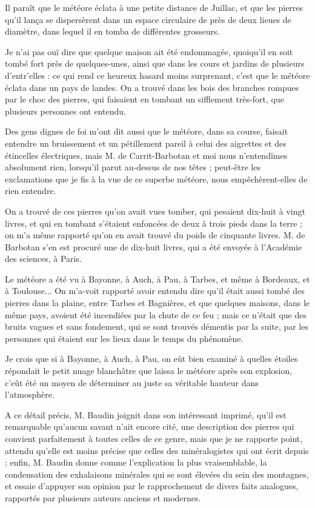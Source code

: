 \documentclass[a4paper, 12pt, oneside, french]{article}
\begin{document}
\og Il paraît que le météore éclata à une petite distance de Juillac, et que les pierres qu'il lança se dispersèrent dans un espace circulaire de près de deux lieues de diamètre, dans lequel il en tomba de différentes grosseurs. \fg

\og Je n'ai pas ouï dire que quelque maison ait été endommagée, quoiqu'il en soit tombé fort près de quelques-unes, ainsi que dans les cours et jardins de plusieurs d'entr'elles : ce qui rend ce heureux hasard moins surprenant, c'est que le météore éclata dans un pays de landes. On a trouvé dans les bois des branches rompues par le choc des pierres, qui faisaient en tombant un sifflement très-fort, que plusieurs personnes ont entendu. \fg

\og Des gens dignes de foi m'ont dit aussi que le météore, dans sa course, faisait entendre un bruissement et un pétillement pareil à celui des aigrettes et des étincelles électriques, mais M. de Carrit-Barbotan et moi nous n'entendîmes absolument rien, lorsqu'il parut au-dessus de nos têtes ; peut-être les exclamations que je fis à la vue de ce superbe météore, nous empêchèrent-elles de rien entendre. \fg

\og On a trouvé de ces pierres qu'on avait vues tomber, qui pesaient dix-huit à vingt livres, et qui en tombant s'étaient enfoncées de deux à trois pieds dans la terre ; on m'a même rapporté qu'on en avait trouvé du poids de cinquante livres. M. de Barbotan s'en est procuré une de dix-huit livres, qui a été envoyée à l'Académie des sciences, à Paris. \fg

\og Le météore a été vu à Bayonne, à Auch, à Pau, à Tarbes, et même à Bordeaux, et à Toulouse... On m'a-voit rapporté avoir entendu dire qu'il était aussi tombé des pierres dans la plaine, entre Tarbes et Bagnières, et que quelques maisons, dans le même pays, avoient été incendiées par la chute de ce feu ; mais ce n'était que des bruits vagues et sans fondement, qui se sont trouvés démentis par la suite, par les personnes qui étaient sur les lieux dans le temps du phénomène. \fg

\og Je crois que si à Bayonne, à Auch, à Pau, on eût bien examiné à quelles étoiles répondait le petit nuage blanchâtre que laissa le météore après son explosion, c'eût été un moyen de déterminer au juste sa véritable hauteur dans l'atmosphère. \fg

A ce détail précis, M. Baudin joignit dans son intéressant imprimé, qu'il est remarquable qu'aucun savant n'ait encore cité, une description des pierres qui convient parfaitement à toutes celles de ce genre, mais que je ne rapporte point, attendu qu'elle est moins précise que celles des minéralogistes qui ont écrit depuis ; enfin, M. Baudin donne comme l'explication la plus vraisemblable, la condensation des exhalaisons minérales qui se sont élevées du sein des montagnes, et essaie d'appuyer son opinion par le rapprochement de divers faits analogues, rapportés par plusieurs auteurs anciens et modernes.
\end{document}
